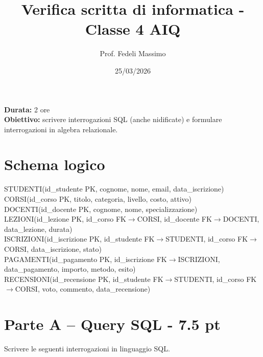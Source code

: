 \documentclass[a4paper,12pt]{article}
\title{Verifica scritta di informatica - Classe 4 AIQ }
\author{Prof. Fedeli Massimo}
\date{25/03/2026}
\begin{document}
	\maketitle
	
	\textbf{Durata:} 2 ore \\
	\textbf{Obiettivo:} scrivere interrogazioni SQL (anche nidificate) e formulare interrogazioni in algebra relazionale.
	
	\section*{Schema logico}
	
	\begin{flushleft}
		STUDENTI(id\_studente PK, cognome, nome, email, data\_iscrizione) \\
		CORSI(id\_corso PK, titolo, categoria, livello, costo, attivo) \\
		DOCENTI(id\_docente PK, cognome, nome, specializzazione) \\
		LEZIONI(id\_lezione PK, id\_corso FK$\rightarrow$CORSI, id\_docente FK$\rightarrow$DOCENTI, data\_lezione, durata) \\
		ISCRIZIONI(id\_iscrizione PK, id\_studente FK$\rightarrow$STUDENTI, id\_corso FK$\rightarrow$CORSI, data\_iscrizione, stato) \\
		PAGAMENTI(id\_pagamento PK, id\_iscrizione FK$\rightarrow$ISCRIZIONI, data\_pagamento, importo, metodo, esito) \\
		RECENSIONI(id\_recensione PK, id\_studente FK$\rightarrow$STUDENTI, id\_corso FK$\rightarrow$CORSI, voto, commento, data\_recensione)
	\end{flushleft}
	
	\section*{Parte A -- Query SQL - 7.5 pt}
	
	Scrivere le seguenti interrogazioni in linguaggio SQL.
	
\end{document}
